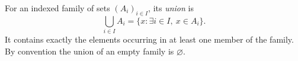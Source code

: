 
For an indexed family of sets $(A_i)_{i\in I}$, its \emph{union} is
\[
\bigcup_{i\in I}A_i=\{x:\exists i\in I,\ x\in A_i\}.
\]
It contains exactly the elements occurring in at least one member of the family. By convention the union of an empty family is $\varnothing$.
